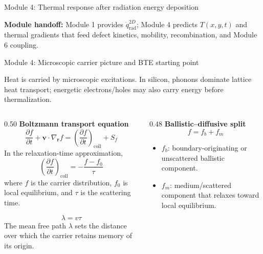 \documentclass[aspectratio=169,9pt]{beamer}
\newcommand{\rvec}{\bm{r}}
\newcommand{\vvec}{\bm{v}}
\newcommand{\qrad}{\dot{q}_{\mathrm{rad}}}
\newcommand{\mfp}{\lambda}
\begin{document}
\begin{frame}{Module 4: Thermal response after radiation energy deposition}
\vspace{1mm}
\begin{orangebox}
\centering\scriptsize
\textbf{Module handoff:} Module 1 provides \(\qrad^{2D}\); Module 4 predicts \(T(x,y,t)\) and thermal gradients that feed defect kinetics, mobility, recombination, and Module 6 coupling.
\end{orangebox}
\end{frame}

\begin{frame}{Module 4: Microscopic carrier picture and BTE starting point}
\footnotesize
\vspace{-4mm}
\begin{bluebox}
\centering\small
Heat is carried by microscopic excitations.  In silicon, phonons dominate lattice heat transport; energetic electrons/holes may also carry energy before thermalization.
\end{bluebox}

\vspace{1mm}
\begin{columns}[T,totalwidth=\textwidth]
\begin{column}{0.50\textwidth}
\textbf{Boltzmann transport equation}
\begin{equation*}
\boxed{\frac{\partial f}{\partial t}+\vvec\cdot\nabla_{\rvec}f
=\left(\frac{\partial f}{\partial t}\right)_{\mathrm{coll}}+S_f}
\end{equation*}
\small
In the relaxation-time approximation,
\begin{equation*}
\boxed{\left(\frac{\partial f}{\partial t}\right)_{\mathrm{coll}}
=-\frac{f-f_0}{\tau}}
\end{equation*}
where \(f\) is the carrier distribution, \(f_0\) is local equilibrium, and \(\tau\) is the scattering time.

\vspace{1mm}
\begin{equation*}
\boxed{\mfp=v\tau}
\end{equation*}
\small
The mean free path \(\mfp\) sets the distance over which the carrier retains memory of its origin.
\end{column}

\begin{column}{0.48\textwidth}
\textbf{Ballistic--diffusive split}
\begin{equation*}
\boxed{f=f_b+f_m}
\end{equation*}
\begin{itemize}\setlength\itemsep{0.25mm}
\item \(f_b\): boundary-originating or unscattered ballistic component.
\item \(f_m\): medium/scattered component that relaxes toward local equilibrium.
\end{itemize}


\end{column}
\end{columns}
\end{frame}
\end{document}
